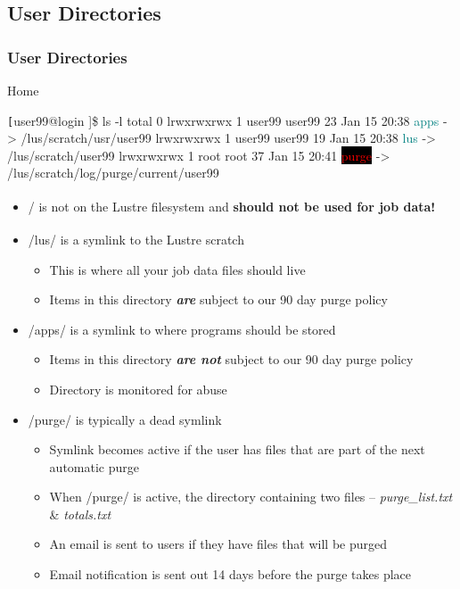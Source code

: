 \documentclass[t,hyperref={pdfpagelabels=false}]{beamer}
\newcommand{\ctilde}{{\fontfamily{ptm}\selectfont\texttildelow}}
\newcommand{\regtrademark}{\fontsize{5}{6}\selectfont \textsuperscript{\textregistered}}
\newcommand{\lustre}{Lustre{\regtrademark}}
\begin{document}
\subsection{User Directories}
\begin{frame}[fragile]
\frametitle{User Directories}
\begin{block}{Home}
\begin{semiverbatim}\tiny \texttt
[user99@login \ctilde]\$ ls -l 
total 0
lrwxrwxrwx 1 user99 user99 23 Jan 15 20:38 \textcolor{teal}{apps} -> /lus/scratch/usr/user99
lrwxrwxrwx 1 user99 user99 19 Jan 15 20:38 \textcolor{teal}{lus} -> /lus/scratch/user99
lrwxrwxrwx 1 root   root   37 Jan 15 20:41 \colorbox{black}{\textcolor{red}{purge}} -> /lus/scratch/log/purge/current/user99
\end{semiverbatim}
\end{block}
	\begin{itemize}\footnotesize
		\item \ctilde{}/ is not on the {\lustre} filesystem and \textbf{should not be used for job data!}
		\item \ctilde{}/lus/ is a symlink to the {\lustre} scratch
		\begin{itemize}\tiny
			\item This is where all your job data files should live
			\item Items in this directory \emph{\textbf{are}} subject to our 90 day purge policy
		\end{itemize}
		\item \ctilde{}/apps/ is a symlink to where programs should be stored
		\begin{itemize}\tiny
			\item Items in this directory \emph{\textbf{are not}} subject to our 90 day purge policy
			\item Directory is monitored for abuse
		\end{itemize}
		\item \ctilde{}/purge/ is typically a dead symlink
		\begin{itemize}\tiny
			\item Symlink becomes active if the user has files that are part of the next automatic purge
			\item When \ctilde{}/purge/ is active, the directory containing two files -- \emph{purge\_list.txt} \& \emph{totals.txt}
			\item An email is sent to users if they have files that will be purged
			\item Email notification is sent out 14 days before the purge takes place
		\end{itemize}
	\end{itemize}
\end{frame}
\end{document}
